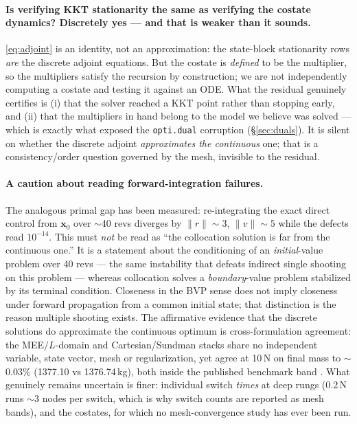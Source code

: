 \documentclass[11pt]{article}
\newcommand{\vx}{\mathbf{x}}
\newcommand{\code}[1]{\texttt{#1}}
\begin{document}
\paragraph{Is verifying KKT stationarity the same as verifying the costate
dynamics? Discretely yes --- and that is weaker than it sounds.}
\eqref{eq:adjoint} is an identity, not an approximation: the state-block
stationarity rows \emph{are} the discrete adjoint equations. But the costate
is \emph{defined} to be the multiplier, so the multipliers satisfy the
recursion by construction; we are not independently computing a costate and
testing it against an ODE. What the residual genuinely certifies is (i) that
the solver reached a KKT point rather than stopping early, and (ii) that the
multipliers in hand belong to the model we believe was solved --- which is
exactly what exposed the \code{opti.dual} corruption
(\S\ref{sec:duals}). It is silent on whether the discrete adjoint
\emph{approximates the continuous} one; that is a consistency/order question
governed by the mesh, invisible to the residual.

\paragraph{A caution about reading forward-integration failures.} The
analogous primal gap has been measured: re-integrating the exact direct
control from $\vx_0$ over $\sim$40 revs diverges by $\|r\|\sim3$,
$\|v\|\sim5$ while the defects read $10^{-14}$. This must \emph{not} be read
as ``the collocation solution is far from the continuous one.'' It is a
statement about the conditioning of an \emph{initial}-value problem over 40
revs --- the same instability that defeats indirect single shooting on this
problem --- whereas collocation solves a \emph{boundary}-value problem
stabilized by its terminal condition. Closeness in the BVP sense does not imply
closeness under forward propagation from a common initial state; that
distinction is the reason multiple shooting exists. The affirmative evidence
that the discrete solutions do approximate the continuous optimum is
cross-formulation agreement: the MEE/$L$-domain and Cartesian/Sundman stacks
share no independent variable, state vector, mesh or regularization, yet agree
at 10\,N on final mass to $\sim$0.03\% (1377.10 vs 1376.74\,kg), both inside
the published benchmark band \cite{HMG2004}. What genuinely remains uncertain
is finer: individual switch \emph{times} at deep rungs (0.2\,N runs
$\sim$3 nodes per switch, which is why switch counts are reported as
mesh bands), and the costates, for which no mesh-convergence study has ever
been run.
\end{document}
